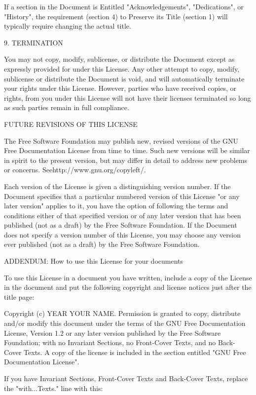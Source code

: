 \documentclass{article}
\begin{document}
If a section in the Document is Entitled "Acknowledgements", "Dedications", or "History", the requirement (section 4) to Preserve its Title (section 1) will typically require changing the actual title. 

9. TERMINATION 

You may not copy, modify, sublicense, or distribute the Document except as expressly provided for under this License. Any other attempt to copy, modify, sublicense or distribute the Document is void, and will automatically terminate your rights under this License. However, parties who have received copies, or rights, from you under this License will not have their licenses terminated so long as such parties remain in full compliance. 


FUTURE REVISIONS OF THIS LICENSE 

The Free Software Foundation may publish new, revised versions of the GNU Free Documentation License from time to time. Such new versions will be similar in spirit to the present version, but may differ in detail to address new problems or concerns.  Seehttp://www.gnu.org/copyleft/. 

Each version of the License is given a distinguishing version number. If the Document specifies that a particular numbered version of this License "or any later version" applies to it, you have the option of following the terms and conditions either of that specified version or of any later version that has been published (not as a draft) by the Free Software Foundation. If the Document does not specify a version number of this License, you may choose any version ever published (not as a draft) by the Free Software Foundation. 

ADDENDUM: How to use this License for your documents 

To use this License in a document you have written, include a copy of the License in the document and put the following copyright and license notices just after the title page: 

Copyright (c)  YEAR  YOUR NAME. Permission is granted to copy, distribute and/or modify this document under the terms of the GNU Free Documentation License, Version 1.2 or any later version published by the Free Software Foundation; with no Invariant Sections, no Front-Cover Texts, and no Back-Cover Texts. A copy of the license is included in the section entitled "GNU Free Documentation License". 

If you have Invariant Sections, Front-Cover Texts and Back-Cover Texts, replace the "with...Texts." line with this: 
\end{document}
